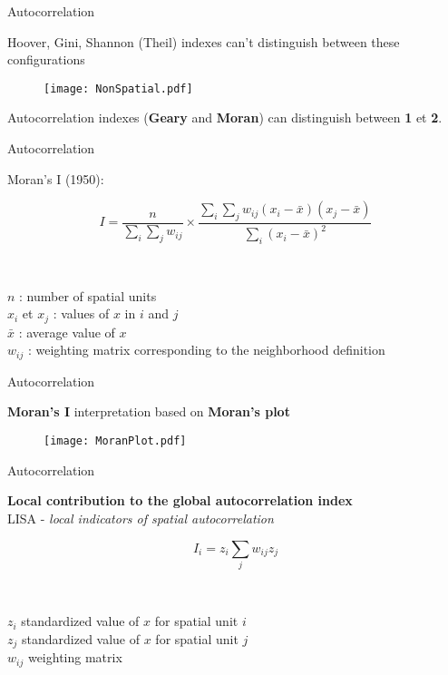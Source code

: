 
\begin{frame}{Autocorrelation}

Hoover, Gini, Shannon (Theil) indexes can't distinguish between these configurations \\ 

\begin{figure}
\texttt{[image: NonSpatial.pdf]}
\end{figure}

Autocorrelation indexes (\textbf{Geary} and \textbf{Moran}) can distinguish between \textbf{1} et \textbf{2}.

\end{frame}


\begin{frame}{Autocorrelation}

Moran's I (1950):

$$
I = \frac{n}{\sum_{i} \sum_{j} w_{ij}} \times \frac{\sum_{i} \sum_{j} w_{ij} (x_i - \bar{x})(x_j - \bar{x})}{\sum_{i} (x_i - \bar{x})^2}
$$

~

$n$ : number of spatial units \\ 
$x_i$ et $x_j$ : values of $x$ in $i$ and $j$ \\ 
$\bar{x}$ : average value of $x$ \\ 
$w_{ij}$ : weighting matrix corresponding to the neighborhood definition

\end{frame}



\begin{frame}{Autocorrelation}

\textbf{Moran's I} interpretation based on \textbf{Moran's plot}

\begin{figure}
\texttt{[image: MoranPlot.pdf]}
\end{figure}

\end{frame}


\begin{frame}{Autocorrelation}

\textbf{Local contribution to the global autocorrelation index} \\
LISA - \emph{local indicators of spatial autocorrelation}

$$
I_i = z_i \sum_{j} w_{ij} z_j
$$

~

$z_i$ standardized value of $x$ for spatial unit $i$ \\
$z_j$ standardized value of $x$ for spatial unit $j$ \\
$w_{ij}$ weighting matrix

\end{frame}


